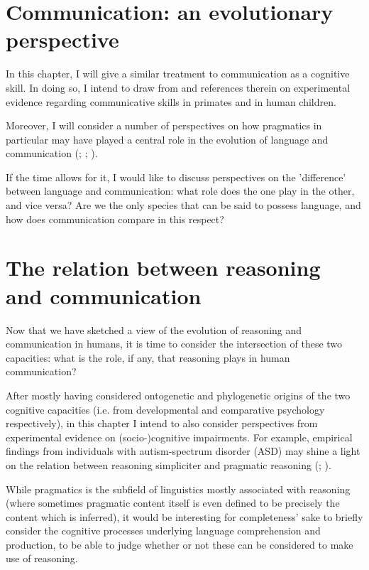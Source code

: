 \documentclass{article}
\begin{document}
\section{Communication: an evolutionary perspective}

In this chapter, I will give a similar treatment to communication as a cognitive skill. In doing so, I intend to draw from \citet{Tomasello08-origins} and references therein on experimental evidence regarding communicative skills in primates and in human children.

Moreover, I will consider a number of perspectives on how pragmatics in particular may have played a central role in the evolution of language and communication (\citet{Benitez21}; \citet{Moore17}; \cite{Scott-Phillips17-pragmatics}).

If the time allows for it, I would like to discuss perspectives on the 'difference' between language and communication: what role does the one play in the other, and vice versa? Are we the only species that can be said to possess language, and how does communication compare in this respect?

\section{The relation between reasoning and communication}

Now that we have sketched a view of the evolution of reasoning and communication in humans, it is time to consider the intersection of these two capacities: what is the role, if any, that reasoning plays in human communication?

After mostly having considered ontogenetic and phylogenetic origins of the two cognitive capacities (i.e. from developmental and comparative psychology respectively), in this chapter I intend to also consider perspectives from experimental evidence on (socio-)cognitive impairments. For example, empirical findings from individuals with autism-spectrum disorder (ASD) may shine a light on the relation between reasoning simpliciter and pragmatic reasoning (\citet{Geurts19}; \citet{Brosnan16}).

While pragmatics is the subfield of linguistics mostly associated with reasoning (where sometimes pragmatic content itself is even defined to be precisely the content which is inferred), it would be interesting for completeness' sake to briefly consider the cognitive processes underlying language comprehension and production, to be able to judge whether or not these can be considered to make use of reasoning.
\end{document}
